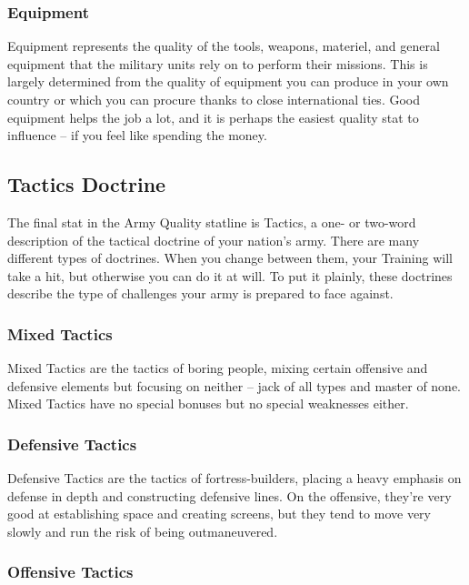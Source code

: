 \documentclass[11 pt]{scrartcl}
\begin{document}
\subsubsection*{Equipment}

Equipment represents the quality of the tools, weapons, materiel, and general equipment that the military units rely on to perform their missions. This is largely determined from the quality of equipment you can produce in your own country or which you can procure thanks to close international ties. Good equipment helps the job a lot, and it is perhaps the easiest quality stat to influence -- if you feel like spending the money.

\subsection{Tactics Doctrine}

The final stat in the Army Quality statline is Tactics, a one- or two-word description of the tactical doctrine of your nation's army. There are many different types of doctrines. When you change between them, your Training will take a hit, but otherwise you can do it at will. To put it plainly, these doctrines describe the type of challenges your army is prepared to face against.

\subsubsection*{Mixed Tactics}

Mixed Tactics are the tactics of boring people, mixing certain offensive and defensive elements but focusing on neither -- jack of all types and master of none. Mixed Tactics have no special bonuses but no special weaknesses either.

\subsubsection*{Defensive Tactics}

Defensive Tactics are the tactics of fortress-builders, placing a heavy emphasis on defense in depth and constructing defensive lines. On the offensive, they're very good at establishing space and creating screens, but they tend to move very slowly and run the risk of being outmaneuvered.

\subsubsection*{Offensive Tactics}
\end{document}
